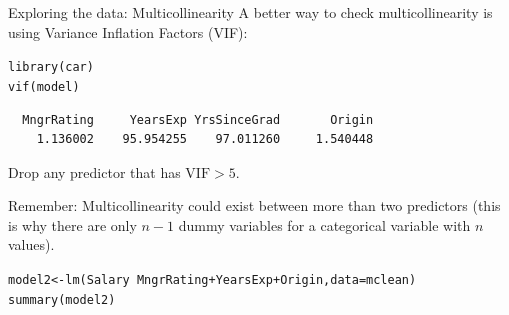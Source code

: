 \documentclass{beamer}\usepackage[]{graphicx}\usepackage[]{color}
\makeatletter
\newcommand{\hlopt}[1]{\textcolor[rgb]{1,0.894,0.769}{#1}}%
\newcommand{\hlstd}[1]{\textcolor[rgb]{1,0.894,0.769}{#1}}%
\newcommand{\hlkwb}[1]{\textcolor[rgb]{0.804,0.776,0.451}{#1}}%
\newcommand{\hlkwc}[1]{\textcolor[rgb]{0.78,0.941,0.545}{#1}}%
\newcommand{\hlkwd}[1]{\textcolor[rgb]{1,0.78,0.769}{#1}}%
\newenvironment{kframe}{%
 \def\at@end@of@kframe{}%
 \ifinner\ifhmode%
  \def\at@end@of@kframe{\end{minipage}}%
  \begin{minipage}{\columnwidth}%
 \fi\fi%
 \def\FrameCommand##1{\hskip\@totalleftmargin \hskip-\fboxsep
 \colorbox{shadecolor}{##1}\hskip-\fboxsep
     \hskip-\linewidth \hskip-\@totalleftmargin \hskip\columnwidth}%
 \MakeFramed {\advance\hsize-\width
   \@totalleftmargin\z@ \linewidth\hsize
   \@setminipage}}%
 {\par\unskip\endMakeFramed%
 \at@end@of@kframe}
\newenvironment{knitrout}{}{} %
\makeatother
\begin{document}
\begin{darkframes}
    
    

    \begin{frame}[fragile]{Exploring the data: Multicollinearity}      
      A better way to check multicollinearity is using Variance Inflation Factors (VIF):
\begin{knitrout}
\begin{kframe}
\begin{alltt}
\hlkwd{library}\hlstd{(car)}
\hlkwd{vif}\hlstd{(model)}
\end{alltt}
\begin{verbatim}
  MngrRating     YearsExp YrsSinceGrad       Origin 
    1.136002    95.954255    97.011260     1.540448 
\end{verbatim}
\end{kframe}
\end{knitrout}
      Drop any predictor that has $\text{VIF} > 5$.
      \pause  \bigskip
      
      \alert{Remember:} Multicollinearity could exist between more than two predictors (this is why there are only $n-1$ dummy variables for a categorical variable with $n$ values).  
   \end{frame}
    
    \begin{frame}[fragile]%
      \fontsize{9}{9}\selectfont
\begin{knitrout}
\begin{kframe}
\begin{alltt}
\hlstd{model2} \hlkwb{<-} \hlkwd{lm}\hlstd{(Salary} \hlopt{~} \hlstd{MngrRating} \hlopt{+} \hlstd{YearsExp} \hlopt{+} \hlstd{Origin,} \hlkwc{data}\hlstd{=mclean)}
\hlkwd{summary}\hlstd{(model2)}
\end{alltt}
\begin{verbatim}


\end{verbatim}
\end{kframe}
\end{knitrout}
\end{frame}
\end{darkframes}
\end{document}
